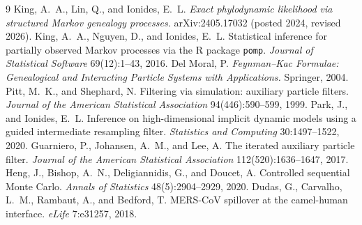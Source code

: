 \documentclass[11pt]{article}
\theoremstyle{plain}
\begin{document}
\begin{thebibliography}{9}
 King, A.~A., Lin, Q., and Ionides, E.~L. \emph{Exact phylodynamic likelihood via
structured Markov genealogy processes.} arXiv:2405.17032 (posted 2024, revised 2026).
 King, A.~A., Nguyen, D., and Ionides, E.~L. Statistical inference for partially
observed Markov processes via the R package \texttt{pomp}. \emph{Journal of Statistical Software}
69(12):1--43, 2016.
 Del Moral, P. \emph{Feynman--Kac Formulae: Genealogical and Interacting Particle
Systems with Applications.} Springer, 2004.
 Pitt, M.~K., and Shephard, N. Filtering via simulation: auxiliary particle
filters. \emph{Journal of the American Statistical Association} 94(446):590--599, 1999.
 Park, J., and Ionides, E.~L. Inference on high-dimensional implicit dynamic
models using a guided intermediate resampling filter. \emph{Statistics and Computing}
30:1497--1522, 2020.
 Guarniero, P., Johansen, A.~M., and Lee, A. The iterated auxiliary particle
filter. \emph{Journal of the American Statistical Association} 112(520):1636--1647, 2017.
 Heng, J., Bishop, A.~N., Deligiannidis, G., and Doucet, A. Controlled sequential
Monte Carlo. \emph{Annals of Statistics} 48(5):2904--2929, 2020.
 Dudas, G., Carvalho, L.~M., Rambaut, A., and Bedford, T. MERS-CoV spillover at the
camel-human interface. \emph{eLife} 7:e31257, 2018.
\end{thebibliography}
\end{document}
